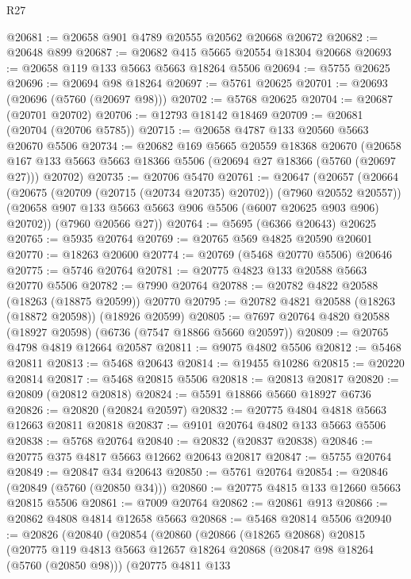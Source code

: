 \begin{lexlean}{R27}
\begin{coremodule}
@20681 := @20658 @901 @4789 @20555 @20562 @20668 @20672
@20682 := @20648 @899
@20687 := @20682 @415 @5665 @20554 @18304 @20668
@20693 := @20658 @119 @133 @5663 @5663 @18264 @5506
@20694 := @5755 @20625
@20696 := @20694 @98 @18264
@20697 := @5761 @20625
@20701 := @20693 (@20696 (@5760 (@20697 @98)))
@20702 := @5768 @20625
@20704 := @20687 (@20701 @20702)
@20706 := @12793 @18142 @18469
@20709 := @20681 (@20704 (@20706 @5785))
@20715 := @20658 @4787 @133 @20560 @5663 @20670 @5506
@20734 := @20682
    @169
    @5665
    @20559
    @18368
    @20670
    (@20658 @167 @133 @5663 @5663 @18366 @5506 (@20694 @27 @18366 (@5760 (@20697 @27))) @20702)
@20735 := @20706 @5470
@20761 := @20647
    (@20657
      (@20664
        (@20675 (@20709 (@20715 (@20734 @20735) @20702)) (@7960 @20552 @20557))
        (@20658 @907 @133 @5663 @5663 @906 @5506 (@6007 @20625 @903 @906) @20702))
      (@7960 @20566 @27))
@20764 := @5695 (@6366 @20643) @20625
@20765 := @5935 @20764
@20769 := @20765 @569 @4825 @20590 @20601
@20770 := @18263 @20600
@20774 := @20769 (@5468 @20770 @5506) @20646
@20775 := @5746 @20764
@20781 := @20775 @4823 @133 @20588 @5663 @20770 @5506
@20782 := @7990 @20764
@20788 := @20782 @4822 @20588 (@18263 (@18875 @20599)) @20770
@20795 := @20782 @4821 @20588 (@18263 (@18872 @20598)) (@18926 @20599)
@20805 := @7697 @20764 @4820 @20588 (@18927 @20598) (@6736 (@7547 @18866 @5660 @20597))
@20809 := @20765 @4798 @4819 @12664 @20587
@20811 := @9075 @4802 @5506
@20812 := @5468 @20811
@20813 := @5468 @20643
@20814 := @19455 @10286
@20815 := @20220 @20814
@20817 := @5468 @20815 @5506
@20818 := @20813 @20817
@20820 := @20809 (@20812 @20818)
@20824 := @5591 @18866 @5660 @18927 @6736
@20826 := @20820 (@20824 @20597)
@20832 := @20775 @4804 @4818 @5663 @12663 @20811 @20818
@20837 := @9101 @20764 @4802 @133 @5663 @5506
@20838 := @5768 @20764
@20840 := @20832 (@20837 @20838)
@20846 := @20775 @375 @4817 @5663 @12662 @20643 @20817
@20847 := @5755 @20764
@20849 := @20847 @34 @20643
@20850 := @5761 @20764
@20854 := @20846 (@20849 (@5760 (@20850 @34)))
@20860 := @20775 @4815 @133 @12660 @5663 @20815 @5506
@20861 := @7009 @20764
@20862 := @20861 @913
@20866 := @20862 @4808 @4814 @12658 @5663
@20868 := @5468 @20814 @5506
@20940 := @20826
    (@20840
      (@20854
        (@20860
          (@20866
            (@18265 @20868)
            @20815
            (@20775
              @119
              @4813
              @5663
              @12657
              @18264
              @20868
              (@20847 @98 @18264 (@5760 (@20850 @98)))
              (@20775
                @4811
                @133

\end{coremodule}
\end{lexlean}
